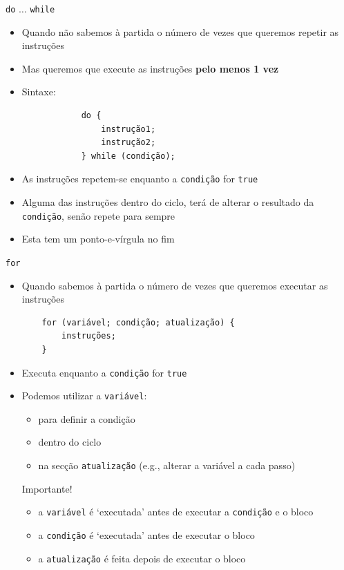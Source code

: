 \documentclass[portuguese, aspectratio=169, xcolor=table]{beamer}
\begin{document}
\begin{frame}[fragile]{\texttt{do} $\ldots$ \texttt{while}}
    \begin{itemize}
        \item Quando não sabemos à partida o número de vezes que queremos repetir as instruções
        \item Mas queremos que execute as instruções \textbf{pelo menos 1 vez}
        \item Sintaxe:
        \begin{verbatim}
            do {
                instrução1;
                instrução2;
            } while (condição);
        \end{verbatim}
        \item As instruções repetem-se enquanto a \texttt{condição} for \texttt{true}
        \item Alguma das instruções dentro do ciclo, terá de alterar o resultado da \texttt{condição}, senão repete para sempre
        \item Esta tem um ponto-e-vírgula no fim
    \end{itemize}
\end{frame}


\begin{frame}[fragile]{\texttt{for}}
\begin{itemize}
    \item Quando sabemos à partida o número de vezes que queremos executar as instruções
    \begin{verbatim}
    for (variável; condição; atualização) {
        instruções;
    }
    \end{verbatim}
\item Executa enquanto a \texttt{condição} for \texttt{true}
\item Podemos utilizar a \texttt{variável}:
\begin{itemize}
    \item para definir a condição
    \item dentro do ciclo
    \item na secção \texttt{atualização} (e.g., alterar a variável a cada passo)
\end{itemize} 

\begin{block}{Importante!}
\begin{itemize}
    \item a \texttt{variável} é `executada' antes de executar a \texttt{condição} e o bloco
    \item a \texttt{condição} é `executada' antes de executar o bloco
    \item a \texttt{atualização} é feita depois de executar o bloco
\end{itemize}
\end{block}


\end{itemize}
\end{frame}
\end{document}
